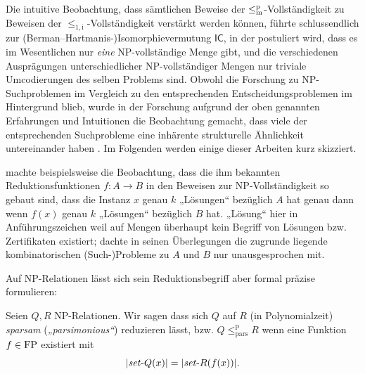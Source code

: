 Die intuitive Beobachtung, dass sämtlichen Beweise der $\leq_\mathrm{m}^\mathrm{p}$-Vollständigkeit zu Beweisen der $\leq_\mathrm{1,i}$-Vollständigkeit verstärkt werden können, führte schlussendlich zur (Berman--Hartmanis-\nolinebreak)\linebreak[1]Isomorphievermutung $\mathsf{IC}$, in der postuliert wird, dass es im Wesentlichen nur \emph{eine} NP-vollständige Menge gibt, und die verschiedenen Ausprägungen unterschiedlicher NP-vollständiger Mengen nur triviale Umcodierungen des selben Problems sind.
Obwohl die Forschung zu NP-Suchproblemen im Vergleich zu den entsprechenden Entscheidungsproblemen im Hintergrund blieb, wurde in der Forschung aufgrund der oben genannten Erfahrungen und Intuitionen die Beobachtung gemacht, dass viele der entsprechenden Suchprobleme eine inhärente strukturelle Ähnlichkeit untereinander haben \parencite[vgl. auch die Diskussion von][]{hemaspaandra_take-home_1998}.
Im Folgenden werden einige dieser Arbeiten kurz skizziert.

\textcite[83]{simon_central_1975} machte beispielsweise die Beobachtung, dass die ihm bekannten Reduktionsfunktionen $f\colon A\to B$ in den Beweisen zur NP-Vollständigkeit so gebaut sind, dass die Instanz $x$ genau $k$ „Lösungen“ bezüglich $A$ hat genau dann wenn $f(x)$ genau $k$ „Lösungen“ bezüglich $B$ hat. „Lösung“ hier in Anführungszeichen weil auf Mengen überhaupt kein Begriff von Lösungen bzw. Zertifikaten existiert; \citeauthor{simon_central_1975} dachte in seinen Überlegungen die zugrunde liegende kombinatorischen (Such-)Probleme zu $A$ und $B$ nur unausgesprochen mit.

Auf NP-Relationen lässt sich sein Reduktionsbegriff aber formal präzise formulieren:
\begin{definition}
    Seien $Q, R$ NP-Relationen. Wir sagen dass sich $Q$ auf $R$ (in Polynomialzeit) \emph{sparsam} (\emph{„parsimonious“}) reduzieren lässt, bzw. $Q\leq_\mathrm{pars}^\mathrm p R$ wenn eine Funktion $f\in\mathrm{FP}$ existiert mit%
    \[ |\mathit{set}\text{-}{}Q(x)|=|\mathit{set}\text{-}{}R(f(x))|. \]
\end{definition}

